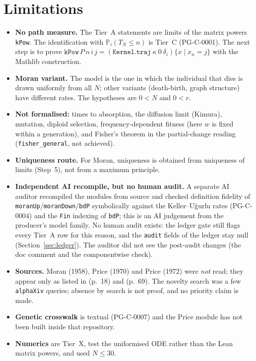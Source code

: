 \documentclass[11pt]{article}
\theoremstyle{remark}
\newcommand{\lean}[1]{\texttt{#1}}
\begin{document}
\section{Limitations}\label{sec:limits}
\begin{itemize}\setlength\itemsep{1pt}
\item \textbf{No path measure.} The Tier~A statements are limits of the matrix powers \lean{kPow}. The identification with $\mathbb P_i(T_N\le n)$ is Tier~C
 (PG-C-0001). The next step is to prove $\texttt{kPow}\,P\,n\,i\,j=(\texttt{Kernel.traj}\ \kappa\ 0\ \delta_i)\{x\mid x_n=j\}$ with the Mathlib construction.
\item \textbf{Moran variant.} The model is the one in which the individual that dies is drawn uniformly from all $N$; other variants (death-birth, graph structure) have different
 rates. The hypotheses are $0<N$ and $0<r$.
\item \textbf{Not formalised:} times to absorption, the diffusion limit (Kimura), mutation, diploid selection, frequency-dependent fitness (here $w$ is fixed within a generation), and
 Fisher's theorem in the partial-change reading (\texttt{fisher\_general}, not achieved).
\item \textbf{Uniqueness route.} For Moran, uniqueness is obtained from uniqueness of limits (Step~5), not from a maximum principle.
\item \textbf{Independent AI recompile, but no human audit.} A separate AI auditor recompiled the modules from source and checked definition fidelity of
 \lean{moranUp}/\lean{moranDown}/\lean{bdP} symbolically against the Keller--U\u{g}urlu rates (PG-C-0004) and the \lean{Fin} indexing of \lean{bdP}; this is an AI judgement from the producer's model family. No human audit exists:
 the ledger gate still flags every Tier~A row for this reason, and the \texttt{audit} fields of the ledger stay null (Section~\ref{sec:ledger}). The auditor did not see the post-audit changes
 (the doc comment and the componentwise check).
\item \textbf{Sources.} Moran (1958), Price (1970) and Price (1972) were \emph{not} read; they appear only as listed in \cite{KU} (p.~18) and \cite{LaG} (p.~69). The novelty
 search was a few \texttt{alphaXiv} queries; absence by search is not proof, and no priority claim is made.
\item \textbf{Genetic crosswalk} is textual (PG-C-0007) and the Price module has not been built inside that repository.
\item \textbf{Numerics} are Tier~X, test the uniformised ODE rather than the Lean matrix powers, and used $N\le30$.
\end{itemize}
\end{document}
